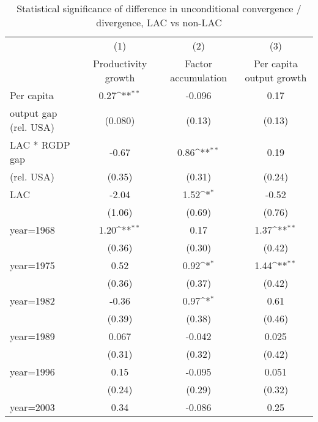 \begin{table}[htbp]\centering
\def\sym#1{\ifmmode^{#1}\else\(^{#1}\)\fi}
\caption{Statistical significance of difference in unconditional convergence / divergence, LAC vs non-LAC}
\begin{tabular}{l*{3}{c}}
\toprule
                &\multicolumn{1}{c}{(1)}&\multicolumn{1}{c}{(2)}&\multicolumn{1}{c}{(3)}\\
                &\multicolumn{1}{c}{Productivity growth}&\multicolumn{1}{c}{Factor accumulation}&\multicolumn{1}{c}{Per capita output growth}\\
\midrule
Per capita      &     0.27\sym{**} &   -0.096         &     0.17         \\
output gap (rel. USA)&  (0.080)         &   (0.13)         &   (0.13)         \\
\addlinespace
LAC * RGDP gap  &    -0.67         &     0.86\sym{**} &     0.19         \\
(rel. USA)      &   (0.35)         &   (0.31)         &   (0.24)         \\
\addlinespace
LAC             &    -2.04         &     1.52\sym{*}  &    -0.52         \\
                &   (1.06)         &   (0.69)         &   (0.76)         \\
\addlinespace
year=1968       &     1.20\sym{**} &     0.17         &     1.37\sym{**} \\
                &   (0.36)         &   (0.30)         &   (0.42)         \\
\addlinespace
year=1975       &     0.52         &     0.92\sym{*}  &     1.44\sym{**} \\
                &   (0.36)         &   (0.37)         &   (0.42)         \\
\addlinespace
year=1982       &    -0.36         &     0.97\sym{*}  &     0.61         \\
                &   (0.39)         &   (0.38)         &   (0.46)         \\
\addlinespace
year=1989       &    0.067         &   -0.042         &    0.025         \\
                &   (0.31)         &   (0.32)         &   (0.42)         \\
\addlinespace
year=1996       &     0.15         &   -0.095         &    0.051         \\
                &   (0.24)         &   (0.29)         &   (0.32)         \\
\addlinespace
year=2003       &     0.34         &   -0.086         &     0.25         \\

\end{tabular}
\end{table}
